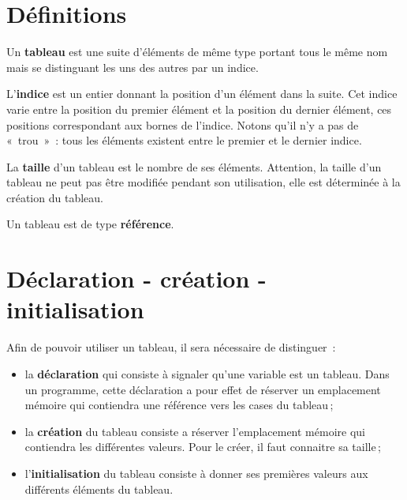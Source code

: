 		
	\section{Définitions}
	
		Un \textbf{tableau} est une suite d’éléments de même type 
		portant tous le même nom mais se distinguant 
		les uns des autres par un indice.
	
		L’\textbf{indice} est un entier
		donnant la position d’un élément dans la suite. 
		Cet indice varie entre la position du premier élément 
		et la position du dernier élément, 
		ces positions correspondant aux bornes de l’indice.
		Notons qu’il n’y a pas de «~trou~»~: 
		tous les éléments existent entre le premier et le dernier indice.
	
		La \textbf{taille} d’un tableau est le nombre de
		ses éléments.  Attention, la taille d’un tableau ne peut pas être
		modifiée pendant son utilisation, elle est déterminée à la création du
		tableau.

		Un tableau est de type \textbf{référence}.
	
	\section{Déclaration - création - initialisation}
	\label{sec:tableaudci}

		Afin de pouvoir utiliser un tableau, il sera nécessaire de distinguer~:
		\begin{itemize}

			\item la \textbf{déclaration} qui consiste à signaler qu'une
				variable est un tableau. Dans un programme, cette déclaration
				a pour effet de réserver un emplacement mémoire qui contiendra
				une référence vers les cases du tableau\,; 

			\item la \textbf{création} du tableau consiste a réserver
				l'emplacement mémoire qui contiendra les différentes valeurs.
				Pour le créer, il faut connaitre sa taille\,; 

			\item l'\textbf{initialisation} du tableau consiste à donner ses
				premières valeurs aux différents éléments du tableau.
		
		\end{itemize}



